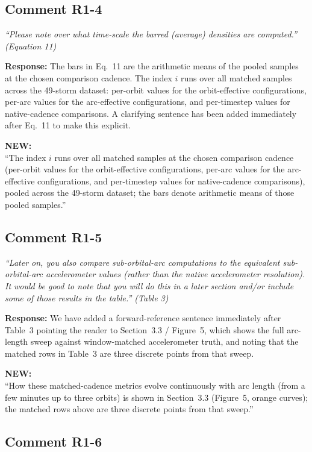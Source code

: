 \documentclass[11pt]{article}
\newcommand{\reviewercomment}[1]{%
  \medskip
  \noindent\textit{\color{reviewblue}#1}%
  \medskip
}
\newcommand{\newtext}[1]{%
  \smallskip
  \noindent\hspace{1em}\begin{minipage}{0.92\textwidth}%
  \color{quotegreen}\textbf{NEW:}\\[2pt]``#1''%
  \end{minipage}%
  \smallskip
}
\begin{document}
\subsection{Comment R1-4}

\reviewercomment{%
``Please note over what time-scale the barred (average) densities are
computed.'' (Equation 11)}

\textbf{Response:}
The bars in Eq.~11 are the arithmetic means of the pooled samples at the
chosen comparison cadence. The index $i$ runs over all matched samples
across the 49-storm dataset: per-orbit values for the orbit-effective
configurations, per-arc values for the arc-effective configurations, and
per-timestep values for native-cadence comparisons. A clarifying sentence
has been added immediately after Eq.~11 to make this explicit.

\newtext{The index $i$ runs over all matched samples at the chosen comparison cadence (per-orbit values for the orbit-effective configurations, per-arc values for the arc-effective configurations, and per-timestep values for native-cadence comparisons), pooled across the 49-storm dataset; the bars denote arithmetic means of those pooled samples.}


\subsection{Comment R1-5}

\reviewercomment{%
``Later on, you also compare sub-orbital-arc computations to the equivalent
sub-orbital-arc accelerometer values (rather than the native accelerometer
resolution). It would be good to note that you will do this in a later
section and/or include some of those results in the table.'' (Table 3)}

\textbf{Response:}
We have added a forward-reference sentence immediately after Table~3
pointing the reader to Section~3.3 / Figure~5, which shows the full
arc-length sweep against window-matched accelerometer truth, and noting
that the matched rows in Table~3 are three discrete points from that
sweep.

\newtext{How these matched-cadence metrics evolve continuously with arc length (from a few minutes up to three orbits) is shown in Section~3.3 (Figure~5, orange curves); the matched rows above are three discrete points from that sweep.}


\subsection{Comment R1-6}
\end{document}
